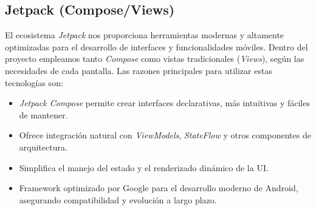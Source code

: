\subsection{Jetpack (Compose/Views)}
El ecosistema \textit{Jetpack} nos proporciona herramientas modernas y altamente optimizadas para el desarrollo de 
interfaces y funcionalidades móviles. Dentro del proyecto empleamos tanto \textit{Compose} como vistas 
tradicionales (\textit{Views}), según las necesidades de cada pantalla. Las razones principales para utilizar estas 
tecnologías son:

\begin{itemize}
    \item \textit{Jetpack Compose} permite crear interfaces declarativas, más intuitivas y fáciles de mantener.
    \item Ofrece integración natural con \textit{ViewModels}, \textit{StateFlow} y otros componentes de arquitectura.
    \item Simplifica el manejo del estado y el renderizado dinámico de la UI.
    \item Framework optimizado por Google para el desarrollo moderno de Android, asegurando compatibilidad y evolución a largo plazo.
\end{itemize}


